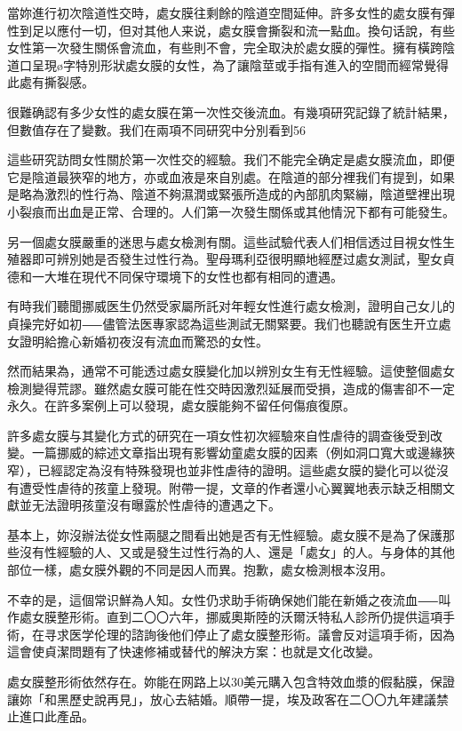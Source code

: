 \documentclass[12pt,UTF8]{ctexbook}
\begin{document}
當妳進行初次陰道性交時，處女膜往剩餘的陰道空間延伸。許多女性的處女膜有彈性到足以應付一切，但对其他人来说，處女膜會撕裂和流一點血。換句话說，有些女性第一次發生關係會流血，有些則不會，完全取決於處女膜的彈性。擁有橫跨陰道口呈現ø字特別形狀處女膜的女性，為了讓陰莖或手指有進入的空間而經常覺得此處有撕裂感。

很難确認有多少女性的處女膜在第一次性交後流血。有幾項研究記錄了統計結果，但數值存在了變數。我们在兩項不同研究中分別看到56%

這些研究訪問女性關於第一次性交的經驗。我们不能完全确定是處女膜流血，即便它是陰道最狹窄的地方，亦或血液是來自別處。在陰道的部分裡我们有提到，如果是略為激烈的性行為、陰道不夠濕潤或緊張所造成的內部肌肉緊繃，陰道壁裡出現小裂痕而出血是正常、合理的。人们第一次發生關係或其他情況下都有可能發生。

另一個處女膜嚴重的迷思与處女檢測有關。這些試驗代表人们相信透过目視女性生殖器即可辨別她是否發生过性行為。聖母瑪利亞很明顯地經歷过處女測試，聖女貞德和一大堆在現代不同保守環境下的女性也都有相同的遭遇。

有時我们聽聞挪威医生仍然受家屬所託对年輕女性進行處女檢測，證明自己女儿的貞操完好如初⸺儘管法医專家認為這些測試无關緊要。我们也聽說有医生开立處女證明給擔心新婚初夜沒有流血而驚恐的女性。

然而結果為，通常不可能透过處女膜變化加以辨別女生有无性經驗。這使整個處女檢測變得荒謬。雖然處女膜可能在性交時因激烈延展而受損，造成的傷害卻不一定永久。在許多案例上可以發現，處女膜能夠不留任何傷痕復原。

許多處女膜与其變化方式的研究在一項女性初次經驗來自性虐待的調查後受到改變。一篇挪威的綜述文章指出現有影響幼童處女膜的因素（例如洞口寬大或邊緣狹窄），已經認定為沒有特殊發現也並非性虐待的證明。這些處女膜的變化可以從沒有遭受性虐待的孩童上發現。附帶一提，文章的作者還小心翼翼地表示缺乏相關文獻並无法證明孩童沒有曝露於性虐待的遭遇之下。

基本上，妳沒辦法從女性兩腿之間看出她是否有无性經驗。處女膜不是為了保護那些沒有性經驗的人、又或是發生过性行為的人、還是「處女」的人。与身体的其他部位一樣，處女膜外觀的不同是因人而異。抱歉，處女檢測根本沒用。

不幸的是，這個常识鮮為人知。女性仍求助手術确保她们能在新婚之夜流血⸺叫作處女膜整形術。直到二〇〇六年，挪威奧斯陸的沃爾沃特私人診所仍提供這項手術，在寻求医学伦理的諮詢後他们停止了處女膜整形術。議會反对這項手術，因為這會使貞潔問題有了快速修補或替代的解決方案：也就是文化改變。

處女膜整形術依然存在。妳能在网路上以30美元購入包含特效血漿的假黏膜，保證讓妳「和黑歷史說再見」，放心去結婚。順帶一提，埃及政客在二〇〇九年建議禁止進口此產品。
\end{document}
